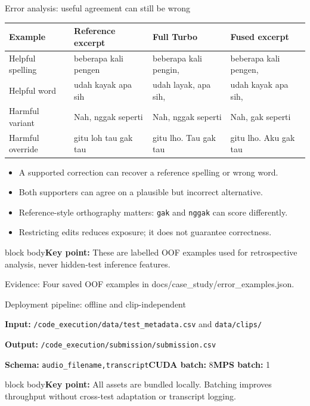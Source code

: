 \documentclass[aspectratio=169,11pt]{beamer}
\newcommand{\takeaway}[1]{\vfill\begin{beamercolorbox}[sep=2mm,wd=\linewidth]{block body}\small\textbf{Key point:} #1\end{beamercolorbox}}
\newcommand{\evidence}[1]{\vspace{1mm}\par{\tiny\color{slate}Evidence: #1\par}}
\begin{document}
\begin{frame}{Error analysis: useful agreement can still be wrong}
\small
\begin{tabular}{@{}P{3.0cm}P{3.9cm}P{4.0cm}P{4.1cm}@{}}\toprule
\textbf{Example}&\textbf{Reference excerpt}&\textbf{Full Turbo}&\textbf{Fused excerpt}\\\midrule
Helpful spelling&beberapa kali pengen&beberapa kali pengin,&beberapa kali pengen,\\
Helpful word&udah kayak apa sih&udah layak, apa sih,&udah kayak apa sih,\\
Harmful variant&Nah, nggak seperti&Nah, nggak seperti&Nah, gak seperti\\
Harmful override&gitu loh tau gak tau&gitu lho. Tau gak tau&gitu lho. Aku gak tau\\\bottomrule
\end{tabular}
\vspace{4mm}
\begin{itemize}\item A supported correction can recover a reference spelling or wrong word.
\item Both supporters can agree on a plausible but incorrect alternative.
\item Reference-style orthography matters: \texttt{gak} and \texttt{nggak} can score differently.
\item Restricting edits reduces exposure; it does not guarantee correctness.
\end{itemize}
\takeaway{These are labelled OOF examples used for retrospective analysis, never hidden-test inference features.}
\evidence{Four saved OOF examples in docs/case\_study/error\_examples.json.}
\end{frame}

\begin{frame}{Deployment pipeline: offline and clip-independent}
\centering
{}
\vspace{3mm}\par\scriptsize
\textbf{Input:} \texttt{/code\_execution/data/test\_metadata.csv} and \texttt{data/clips/}\par
\textbf{Output:} \texttt{/code\_execution/submission/submission.csv}\par
\textbf{Schema:} \texttt{audio\_filename,transcript}\quad\textbf{CUDA batch:} 8\quad\textbf{MPS batch:} 1
\takeaway{All assets are bundled locally. Batching improves throughput without cross-test adaptation or transcript logging.}
\end{frame}
\end{document}
